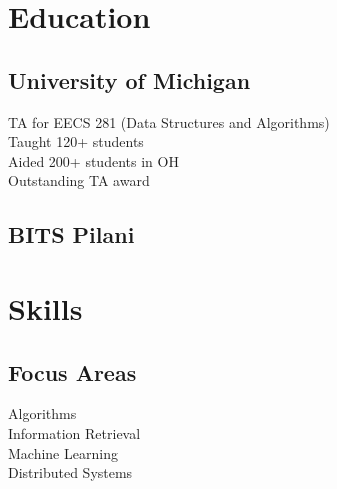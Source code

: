 \documentclass[]{resume-openfont}
\begin{document}
%
%
\lastupdated

%
%
%
%
\begin{minipage}[t]{0.25\textwidth} 


\section{Education} 

\subsection{University of Michigan}
\sectionsep
\textbullet{} TA for EECS 281 (Data Structures and Algorithms)\\
\textbullet{} Taught 120+ students\\
\textbullet{} Aided 200+ students in OH\\
\textbullet{} Outstanding TA award
\sectionsep

\subsection{BITS Pilani}
\sectionsep

\section{Skills}
\subsection{Focus Areas}
\textbullet{} Algorithms \\
\textbullet{} Information Retrieval \\
\textbullet{} Machine Learning \\
\textbullet{} Distributed Systems \\
\sectionsep


\end{minipage}
\end{document}
